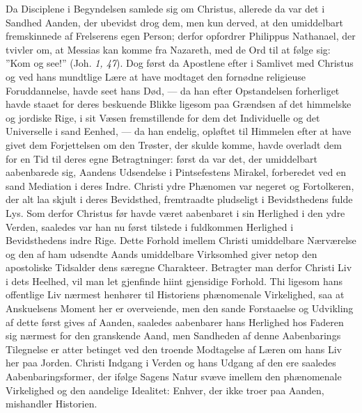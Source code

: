 \documentclass[12pt]{book}
\newcommand{\opage}[1]{\marginnote{\footnotesize\textit{[#1]}}}
\begin{document}
Da Disciplene i Begyndelsen samlede sig om Christus, allerede da var det i
Sandhed Aanden, der ubevidst drog dem, men kun derved, at den umiddelbart
fremskinnede af Frelserens egen Person; derfor opfordrer Philippus Nathanael, der
tvivler om, at Messias kan komme fra Nazareth, med de Ord til at følge sig: ”Kom
og see!” (Joh. \textit{1, 47}). Dog først da Apostlene efter i Samlivet med
Christus og ved hans mundtlige Lære at have modtaget den fornødne religieuse
Foruddannelse, havde seet hans Død, --- da han efter Opstandelsen forherliget
havde staaet for deres beskuende Blikke ligesom paa Grændsen af det himmelske og
jordiske Rige, i sit Væsen fremstillende for dem det Individuelle og det
Universelle i sand Eenhed, --- da han endelig, opløftet til Himmelen efter at
have givet dem Forjettelsen om den Trøster, der skulde komme, havde overladt dem
for en Tid til deres egne Betragtninger: først da var det, der umiddelbart
aabenbarede sig, Aandens Udsendelse i Pintsefestens Mirakel, forberedet ved en
sand Mediation i deres Indre. Christi ydre Phænomen var negeret og Fortolkeren,
der alt laa skjult i deres Bevidsthed, fremtraadte pludseligt i Bevidsthedens
fulde Lys. Som derfor Christus før havde været aabenbaret i sin Herlighed i den
ydre Verden, saaledes var han nu først tilstede i fuldkommen Herlighed i
Bevidsthedens indre Rige. Dette Forhold imellem Christi umiddelbare Nærværelse og
den af ham udsendte Aands umiddelbare Virksomhed giver netop den apostoliske
Tidsalder dens særegne Charakteer. Betragter man derfor Christi Liv i dets
Heelhed, vil man let gjenfinde hiint gjensidige Forhold. Thi ligesom hans
offentlige Liv nærmest henhører til Historiens phænomenale Virkelighed, saa at
Anskuelsens Moment her er
\opage{155} overveiende, men den sande Forstaaelse og Udvikling af dette først gives af
Aanden, saaledes aabenbarer hans Herlighed hos Faderen sig nærmest for den
granskende Aand, men Sandheden af denne Aabenbarings Tilegnelse er atter betinget
ved den troende Modtagelse af Læren om hans Liv her paa Jorden. Christi Indgang i
Verden og hans Udgang af den ere saaledes Aabenbaringsformer, der ifølge Sagens
Natur svæve imellem den phænomenale Virkelighed og den aandelige Idealitet:
Enhver, der ikke troer paa Aanden, mishandler Historien.
\end{document}
